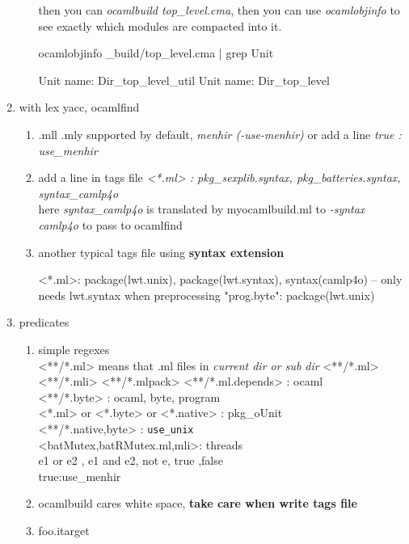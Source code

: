 \begin{enumerate}
\begin{enumerate}
then you can \textit{ocamlbuild top\_level.cma}, then you can use
\textit{ocamlobjinfo} to see exactly which modules are compacted into
it.

\begin{redcode}
ocamlobjinfo _build/top_level.cma | grep Unit  
\end{redcode}

\begin{bluecode}
Unit name: Dir_top_level_util
Unit name: Dir_top_level
\end{bluecode}


\end{enumerate}

\item with lex yacc, ocamlfind 

\begin{enumerate}
\item .mll .mly supported by default, \textit{menhir (-use-menhir)} or add a line
  \textit{true : use\_menhir}

\item add a line in tags file 
  \textit{<*.ml> : pkg\_sexplib.syntax, pkg\_batteries.syntax, syntax\_camlp4o} \\
  here \textit{syntax\_camlp4o} is translated by myocamlbuild.ml to \emph{-syntax camlp4o} to pass to ocamlfind

\item another typical tags file using \textbf{ syntax extension}
  

\begin{bluetext}
<*.ml>: package(lwt.unix), package(lwt.syntax), syntax(camlp4o) -- only needs lwt.syntax when preprocessing
"prog.byte": package(lwt.unix)
\end{bluetext}

  
\end{enumerate}

\item predicates
  
\begin{enumerate}
\item simple regexes \\
  <**/*.ml>   means that .ml files in \emph{current dir or sub dir}
  <**/*.ml> <**/*.mli> <**/*.mlpack> <**/*.ml.depends> : ocaml \\
  <**/*.byte> : ocaml, byte, program \\
  <*.ml> or <*.byte> or <*.native> : pkg\_oUnit \\
  <**/*.{native,byte}> : \verb|use_unix| \\
  <{batMutex,batRMutex}.{ml,mli}>: threads \\
  e1 or e2 , e1 and e2, not e, true ,false \\
  true:use\_menhir \\
\item  ocamlbuild cares white space, \textbf{ take care when write tags file}
\item foo.itarget
  


\end{enumerate}
\end{enumerate}
